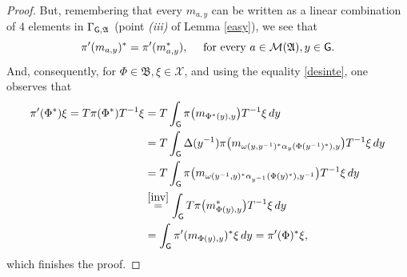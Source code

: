 \documentclass[10pt,a4paper]{amsart}
\def\G{{\sf G}}
\def\X{\mathcal{X}}
\def\d{{\rm d}}
\newcommand{\A}{\mathfrak{A}}
\newcommand{\B}{\mathfrak{B}}
\begin{document}
\begin{proof}
But, remembering that every $m_{a,y}$ can be written as a linear combination of $4$ elements in $\Gamma_{\G,\A}$ (point \emph{(iii)} of Lemma \ref{easy}), we see that
$$
\pi'(m_{a,y})^*=\pi'(m^*_{a,y}),\quad\text{ for every }a\in\mathcal{M}(\A),y\in \G.
$$
And, consequently, for $\Phi\in \B,\xi\in\X$, and using the equality \eqref{desinte}, one observes that
\begin{align*}
    \pi'(\Phi^*)\xi=T\pi(\Phi^*)T^{-1}\xi&=T\int_\G \pi\big( m_{\Phi^*(y),y}\big)T^{-1}\xi\,\d y \\
    &= T\int_\G \Delta(y^{-1})\pi\big(m_{\omega(y,y^{-1})^*\alpha_y(\Phi(y^{-1})^*),y}\big)T^{-1}\xi\,\d y \\
    &=T\int_\G \pi\big(m_{\omega(y^{-1},y)^*\alpha_{y^{-1}}(\Phi(y)^*),y^{-1}}\big)T^{-1}\xi\,\d y \\
    &\overset{\eqref{inv}}{=}\int_\G T\pi\big(m_{\Phi(y),y}^*\big)T^{-1}\xi\,\d y \\
    &=\int_\G \pi'(m_{\Phi(y),y})^*\xi\,\d y=\pi'(\Phi)^*\xi,
\end{align*}
 which finishes the proof.
\end{proof}
\end{document}
